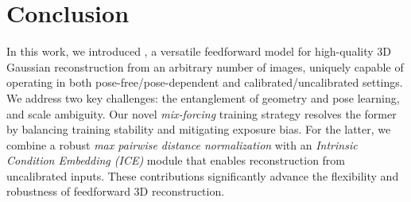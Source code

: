 \vspace{-3mm}
\section{Conclusion}
\vspace{-4mm}
In this work, we introduced \ourmethod, a versatile feedforward model for high-quality 3D Gaussian reconstruction from an arbitrary number of images, uniquely capable of operating in both pose-free/pose-dependent and calibrated/uncalibrated settings. We address two key challenges: the entanglement of geometry and pose learning, and scale ambiguity. Our novel \emph{mix-forcing} training strategy resolves the former by balancing training stability and mitigating exposure bias. For the latter, we combine a robust \emph{max pairwise distance normalization} with an \emph{Intrinsic Condition Embedding (ICE)} module that enables reconstruction from uncalibrated inputs. These contributions significantly advance the flexibility and robustness of feedforward 3D reconstruction.
